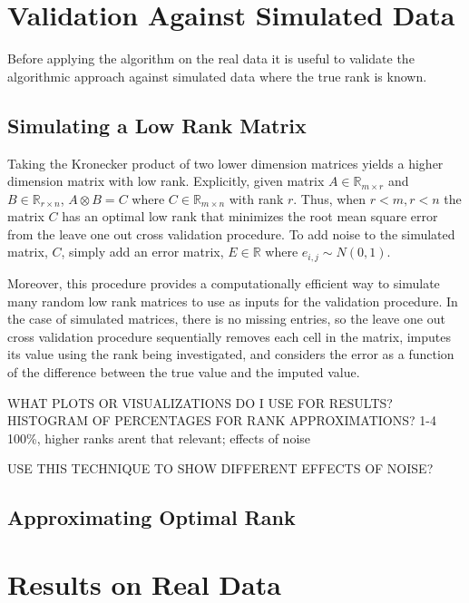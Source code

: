 \documentclass[12pt,twoside]{dukestatscithesis}
\theoremstyle{definition}
\theoremstyle{definition}
\theoremstyle{definition}
\theoremstyle{remark}
\begin{document}
\section{Validation Against Simulated
Data}\label{validation-against-simulated-data}

Before applying the algorithm on the real data it is useful to validate
the algorithmic approach against simulated data where the true rank is
known.

\subsection{Simulating a Low Rank
Matrix}\label{simulating-a-low-rank-matrix}

Taking the Kronecker product of two lower dimension matrices yields a
higher dimension matrix with low rank. Explicitly, given matrix
\(A \in \mathbb{R}_{m \times r}\) and \(B \in \mathbb{R}_{r \times n}\),
\(A \otimes B = C\) where \(C \in \mathbb{R}_{m \times n}\) with rank
\(r\). Thus, when \(r < m, r < n\) the matrix \(C\) has an optimal low
rank that minimizes the root mean square error from the leave one out
cross validation procedure. To add noise to the simulated matrix, \(C\),
simply add an error matrix, \(E \in \mathbb{R}\) where
\(e_{i,j} \sim N(0,1)\).

Moreover, this procedure provides a computationally efficient way to
simulate many random low rank matrices to use as inputs for the
validation procedure. In the case of simulated matrices, there is no
missing entries, so the leave one out cross validation procedure
sequentially removes each cell in the matrix, imputes its value using
the rank being investigated, and considers the error as a function of
the difference between the true value and the imputed value.

WHAT PLOTS OR VISUALIZATIONS DO I USE FOR RESULTS? HISTOGRAM OF
PERCENTAGES FOR RANK APPROXIMATIONS? 1-4 100\%, higher ranks arent that
relevant; effects of noise

USE THIS TECHNIQUE TO SHOW DIFFERENT EFFECTS OF NOISE?

\subsection{Approximating Optimal
Rank}\label{approximating-optimal-rank}

\section{Results on Real Data}\label{results-on-real-data}
\end{document}
